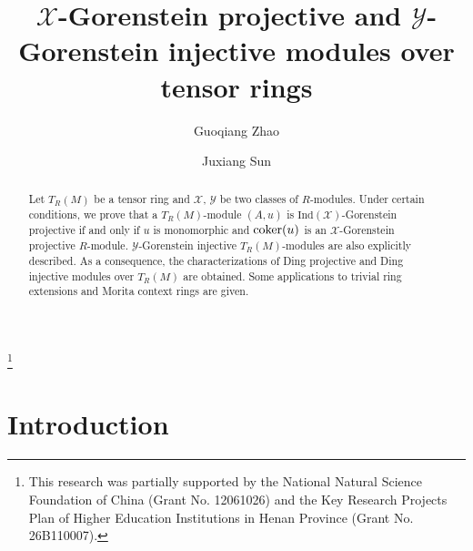 \documentclass[10pt,twoside]{amsart}
\theoremstyle{bfupright head,slanted body}
\theoremstyle{bfupright head,upright body}
\theoremstyle{fixed bf head,slanted body}
\theoremstyle{fixed bf head,upright body}
\theoremstyle{numbered paragraph}
\numberwithin{equation}{res}
\newcommand{\Ind}{\mathrm{Ind}}
\newcommand{\cok}{\mbox{\rm coker}}
\begin{document}
\title[Relative Gorenstein modules over tensor rings]%
{$\mathcal{X}$-Gorenstein projective and $\mathcal{Y}$-Gorenstein injective modules over tensor rings}

\author[G.Q. Zhao]{Guoqiang Zhao}
\address{Guoqiang Zhao: Department of Mathmatics,
Hangzhou Dianzi University, Hangzhou 310018, China}

\author[J.X. Sun]{Juxiang Sun}
\address{Juxiang Sun (Corresponding author):
School of Mathematics and Statistics, Shangqiu Normal University, Shangqiu 476000, China}

\thanks{This research was partially supported by the National Natural Science Foundation of China (Grant No. 12061026) and the Key Research Projects Plan of Higher Education Institutions in Henan Province (Grant No. 26B110007).}





\begin{abstract}
Let $T_R(M)$ be a tensor ring and $\mathcal{X}$, $\mathcal{Y}$ be two classes of $R$-modules.
Under certain conditions, we prove that a $T_R(M)$-module $(A, u)$ is $\Ind(\mathcal{X})$-Gorenstein projective if and only if
$u$ is monomorphic and $\cok(u)$ is an $\mathcal{X}$-Gorenstein projective $R$-module.
$\mathcal{Y}$-Gorenstein injective $T_R(M)$-modules are also explicitly described.
As a consequence, the characterizations of Ding projective and Ding injective modules over $T_R(M)$ are obtained. 
Some applications to trivial ring extensions and Morita context rings are given.
\end{abstract}

\maketitle

\thispagestyle{empty}

\section*{Introduction}
\label{Preliminaries}%
\end{document}
